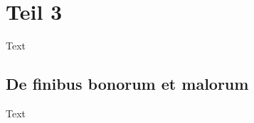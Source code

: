 %
%
%
%
\section{Teil 3
\label{brown:section:teil3}}

Text

\subsection{De finibus bonorum et malorum
\label{brown:subsection:malorum}}

Text


